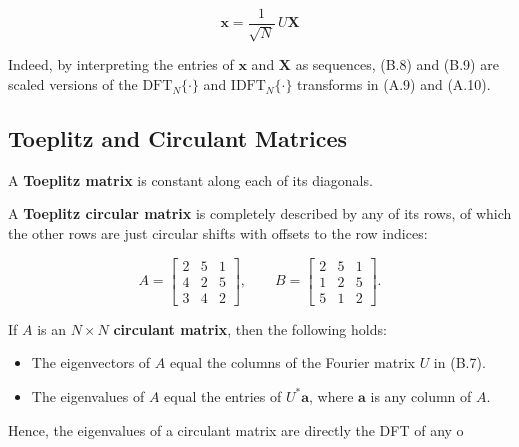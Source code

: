 \begin{equation}
\mathbf{x} = \frac{1}{\sqrt{N}} \, U \mathbf{X}
\tag{B.9}
\end{equation}

Indeed, by interpreting the entries of $\mathbf{x}$ and $\mathbf{X}$ as sequences, (B.8) and (B.9) are scaled versions of the $\text{DFT}_N\{\cdot\}$ and $\text{IDFT}_N\{\cdot\}$ transforms in (A.9) and (A.10).

\subsection{Toeplitz and Circulant Matrices}

A \textbf{Toeplitz matrix} is constant along each of its diagonals.

A \textbf{Toeplitz circular matrix} is completely described by any of its rows,  
of which the other rows are just circular shifts with offsets to the row indices:

\begin{equation}
A =
\begin{bmatrix}
2 & 5 & 1 \\
4 & 2 & 5 \\
3 & 4 & 2
\end{bmatrix}
,\qquad
B =
\begin{bmatrix}
2 & 5 & 1 \\
1 & 2 & 5 \\
5 & 1 & 2
\end{bmatrix}.
\tag{B.10}
\end{equation}

If $A$ is an $N \times N$ \textbf{circulant matrix}, then the following holds:

\begin{itemize}
    \item The eigenvectors of $A$ equal the columns of the Fourier matrix $U$ in (B.7).
    \item The eigenvalues of $A$ equal the entries of $U^* \mathbf{a}$, where $\mathbf{a}$ is any column of $A$.
\end{itemize}

Hence, the eigenvalues of a circulant matrix are directly the DFT of any o
